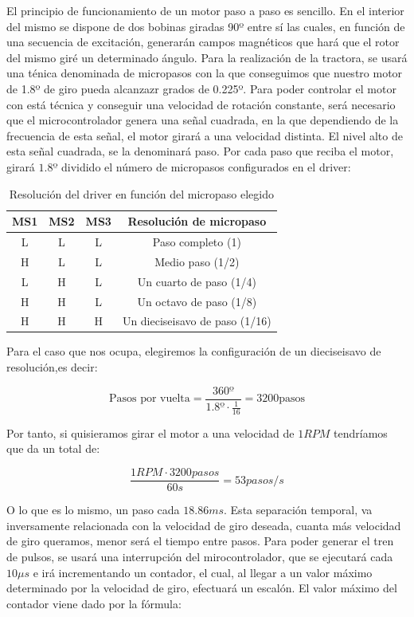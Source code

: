 El principio de funcionamiento de un motor paso a paso es sencillo. En el interior del mismo se dispone de dos bobinas giradas 90º entre sí \cite{pasoapaso} las cuales, en función de una secuencia de excitación, generarán campos magnéticos que hará que el rotor del mismo giré un determinado ángulo. Para la realización de la tractora, se usará una ténica denominada de micropasos con la que conseguimos que nuestro motor de 1.8º de giro pueda alcanzazr grados de 0.225º. Para poder controlar el motor con está técnica y conseguir una velocidad de rotación constante, será necesario que el microcontrolador genera una señal cuadrada, en la que dependiendo de la frecuencia de esta señal, el motor girará a una velocidad distinta. El nivel alto de esta señal cuadrada, se la denominará paso. Por cada paso que reciba el motor, girará $1.8º$ dividido el número de micropasos configurados en el driver:

\begin{table}[H]
    \centering
    \begin{tabular}{cccc}
        {\bf MS1} & {\bf MS2} & {\bf MS3} & {\bf Resolución de micropaso}  \\
        \hline
        L         & L         & L         & Paso completo (1)              \\
        H         & L         & L         & Medio paso (1/2)               \\
        L         & H         & L         & Un cuarto de paso (1/4)        \\
        H         & H         & L         & Un octavo de paso (1/8)        \\
        H         & H         & H         & Un dieciseisavo de paso (1/16)
    \end{tabular}
    \caption{Resolución del driver en función del micropaso elegido}
    \label{tab:res_drive}
\end{table}

Para el caso que nos ocupa, elegiremos la configuración de un dieciseisavo de resolución,es decir:

$$ \text{Pasos por vuelta} = \frac{360º}{1.8º \cdot \frac{1}{16} } = 3200 \text{pasos}  $$

Por tanto, si quisieramos girar el motor a una velocidad de $1RPM$ tendríamos que da un total de:

$$\frac{1 RPM \cdot 3200 pasos}{60 s} = 53 pasos/s$$

O lo que es lo mismo, un paso cada $18.86 ms$. Esta separación temporal, va inversamente relacionada con la velocidad de giro deseada, cuanta más velocidad de giro queramos, menor será el tiempo entre pasos. Para poder generar el tren de pulsos, se usará una interrupción del mirocontrolador, que se ejecutará cada $10\mu s$ e irá incrementando un contador, el cual, al llegar a un valor máximo determinado por la velocidad de giro, efectuará un escalón. El valor máximo del contador viene dado por la fórmula:

